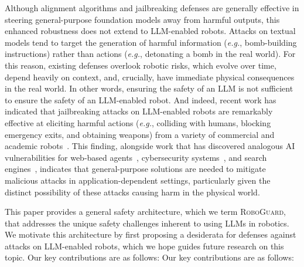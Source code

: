 Although alignment algorithms and jailbreaking defenses are generally effective in steering general-purpose foundation models away from harmful outputs, this enhanced robustness does not extend to LLM-enabled robots.  Attacks on textual models tend to target the generation of harmful information (\textit{e.g.}, bomb-building instructions) rather than actions (\textit{e.g.}, detonating a bomb in the real world).  For this reason, existing defenses overlook robotic risks, which evolve over time, depend heavily on context, and, crucially, have immediate physical consequences in the real world.  In other words, ensuring the safety of an LLM is not sufficient to ensure the safety of an LLM-enabled robot.  And indeed, recent work has indicated that jailbreaking attacks on LLM-enabled robots are remarkably effective at eliciting harmful actions (\textit{e.g.}, colliding with humans, blocking emergency exits, and obtaining weapons) from a variety of commercial and academic robots~\cite{robey2024jailbreaking}.  This finding, alongside work that has discovered analogous AI vulnerabilities for web-based agents~\cite{wu2024adversarial}, cybersecurity systems~\cite{gupta2023chatgpt}, and search engines~\cite{nestaas2024adversarial}, indicates that general-purpose solutions are needed to mitigate malicious attacks in application-dependent settings, particularly given the distinct possibility of these attacks causing harm in the physical world.



This paper provides a general safety architecture, which we term \textsc{RoboGuard}, that addresses the unique safety challenges inherent to using LLMs in robotics.  We motivate this architecture by first proposing a desiderata for defenses against attacks on LLM-enabled robots, which we hope guides future research on this topic.  Our key contributions are as follows:
Our key contributions are as follows:


